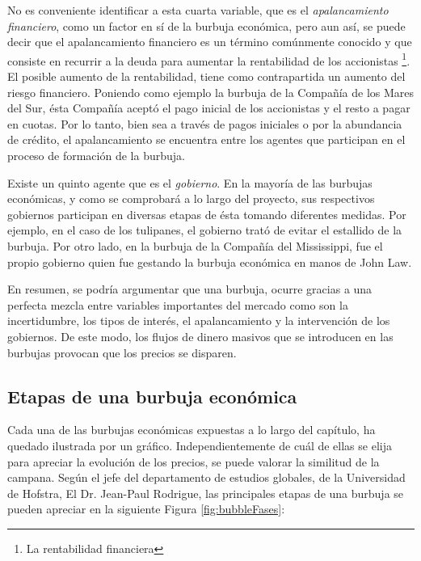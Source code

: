 No es conveniente identificar a esta cuarta variable, que es el \emph{apalancamiento financiero}, como un factor en sí de la burbuja económica, pero aun así, se puede decir que el apalancamiento financiero es un término comúnmente conocido y que consiste en recurrir a la deuda para aumentar la rentabilidad de los accionistas \footnote{La rentabilidad financiera}. El posible aumento de la rentabilidad, tiene como contrapartida un aumento del riesgo financiero. Poniendo como ejemplo la burbuja de la Compañía de los Mares del Sur, ésta Compañía aceptó el pago inicial de los accionistas y el resto a pagar en cuotas. Por lo tanto, bien sea a través de pagos iniciales o por la abundancia de crédito, el apalancamiento se encuentra entre los agentes que participan en el proceso de formación de la burbuja.

Existe un quinto agente que es el \emph{gobierno}. En la mayoría de las burbujas económicas, y como se comprobará a lo largo del proyecto, sus respectivos gobiernos participan en diversas etapas de ésta tomando diferentes medidas. Por ejemplo, en el caso de los tulipanes, el gobierno trató de evitar el estallido de la burbuja. Por otro lado, en la burbuja de la Compañía del Mississippi, fue el propio gobierno quien fue gestando la burbuja económica en manos de John Law. 

En resumen, se podría argumentar que una burbuja, ocurre gracias a una perfecta mezcla entre variables importantes del mercado como son la incertidumbre, los tipos de interés, el apalancamiento y la intervención de los gobiernos. De este modo, los flujos de dinero masivos que se introducen en las burbujas provocan que los precios se disparen.

\subsection{Etapas de una burbuja económica}

Cada una de las burbujas económicas expuestas a lo largo del capítulo, ha quedado ilustrada por un gráfico. Independientemente de cuál de ellas se elija para apreciar la evolución de los precios, se puede valorar la similitud de la campana. Según el jefe del departamento de estudios globales, de la Universidad de Hofstra, El Dr. Jean-Paul Rodrigue, las principales etapas de una burbuja se pueden apreciar en la siguiente Figura \ref{fig:bubbleFases}:

